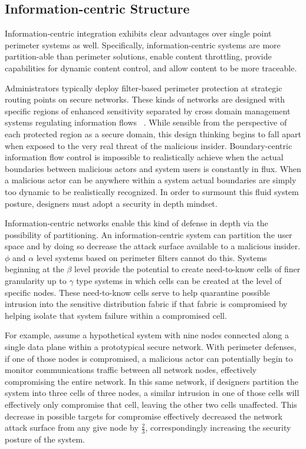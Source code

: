 \subsection{Information-centric Structure}
Information-centric integration exhibits clear advantages over single point perimeter systems as well.  Specifically, information-centric systems are more partition-able than perimeter solutions, enable content throttling, provide capabilities for dynamic content control, and allow content to be more traceable.

Administrators typically deploy filter-based perimeter protection at strategic routing points on secure networks.  These kinds of networks are designed with specific regions of enhanced sensitivity separated by cross domain management systems regulating information flows ~\cite{proposal:nsa-arch,proposal:raytheon-arch,proposal:bah-arch}.  While sensible from the perspective of each protected region as a secure domain, this design thinking begins to fall apart when exposed to the very real threat of the malicious insider.  Boundary-centric information flow control is impossible to realistically achieve when the actual boundaries between malicious actors and system users is constantly in flux.  When a malicious actor can be anywhere within a system actual boundaries are simply too dynamic to be realistically recognized.  In order to surmount this fluid system posture, designers must adopt a security in depth mindset.

Information-centric networks enable this kind of defense in depth via the possibility of partitioning.  An information-centric system can partition the user space and by doing so decrease the attack surface available to a malicious insider.  $\phi$ and $\alpha$ level systems based on perimeter filters cannot do this.  Systems beginning at the $\beta$ level provide the potential to create need-to-know cells of finer granularity up to $\gamma$ type systems in which cells can be created at the level of specific nodes.  These need-to-know cells serve to help quarantine possible intrusion into the sensitive distribution fabric if that fabric is compromised by helping isolate that system failure within a compromised cell.

For example, assume a hypothetical system with nine nodes connected along a single data plane within a prototypical secure network.  With perimeter defenses, if one of those nodes is compromised, a malicious actor can potentially begin to monitor communications traffic between all network nodes, effectively compromising the entire network.  In this same network, if designers partition the system into three cells of three nodes, a similar intrusion in one of those cells will effectively only compromise that cell, leaving the other two cells unaffected.  This decrease in possible targets for compromise effectively decreased the network attack surface from any give node by $\frac{2}{3}$, correspondingly increasing the security posture of the system.

